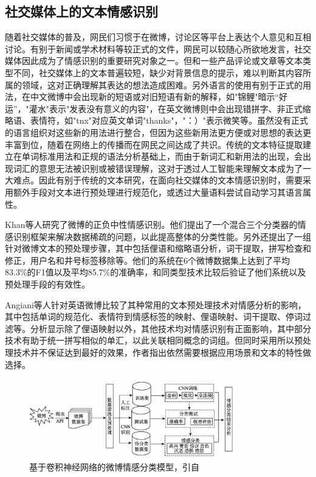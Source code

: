 \subsection{社交媒体上的文本情感识别}

随着社交媒体的普及，网民们习惯于在微博，讨论区等平台上表达个人意见和互相讨论。有别于新闻或学术材料等较正式的文件，网民可以较随心所欲地发言，社交媒体因此成为了情感识别的重要研究对象之一。但和一些产品评论或文章等文本类型不同，社交媒体上的文本普遍较短\cite{Madhusudhanan2018survey}，缺少对背景信息的提示，难以判断其内容所属的领域，这对正确理解其表达的想法造成困难。另外语言的使用有别于正式的用法，在中文微博中会出现新的短语或对旧短语有新的解释\cite{xie2012jiyu}，如"锦鲤"暗示“好运”，"灌水"表示"发表没有意义的内容"，在英文微博则中会出现错拼字、非正式缩略语、表情符\cite{go2009twitter}\cite{paltoglou2012twitter}，如"tnx"对应英文单词"thanks"，"：）"表示微笑等。虽然没有正式的语言组织对这些新的用法进行整合，但因为这些新用法更方便或对思想的表达更丰富到位，随着在网络上的传播而在网民之间达成了共识。传统的文本特征提取建立在单词标准用法和正规的语法分析基础上，而由于新词汇和新用法的出现，会出现词汇的意思无法被识别或被错误理解，这对于透过人工智能来理解文本成为了一大难点。因此有别于传统的文本研究，在面向社交媒体的文本情感识别时，需要采用额外手段对文本进行预处理进行规范化，或透过大量语料尝试自动学习其语言属性。

Khan等人\cite{khan2014tom}研究了微博的正负中性情感识别。他们提出了一个混合三个分类器的情感识别框架来解决数据稀疏的问题，以此提高整体的分类性能。另外还提出了一组针对微博文本的预处理步骤，其中包括俚语和缩略语分析，词干提取，拼写检查和修正，用户名和井号标签移除等。他们的系统在6个微博数据集上达到了平均83.3\%的F1值以及平均85.7\%的准确率，和同类型技术比较后验证了他们系统以及预处理手段的有效性。

Angiani等人\cite{angiani2016comparison}针对英语微博比较了其种常用的文本预处理技术对情感分析的影响，其中包括单词的规范化、表情符到情感标签的映射、俚语映射、词干提取、停词过滤等。分析显示除了俚语映射以外，其他技术均对情感识别有正面影响，其中部分技术有助于统一拼写相似的单汇，以此关联相同概念的词组。但同时采用所以预处理技术并不保证达到最好的效果，作者指出依然需要根据应用场景和文本的特性做选择。

\begin{figure}[H] %
  \centering
  \includegraphics[width=0.8\textwidth]{img/zhang2018jiyu.png}
  \caption{基于卷积神经网络的微博情感分类模型，引自\cite{zhang2018jiyu}}
  \label{fig:zhang2018jiyu}
\end{figure}

